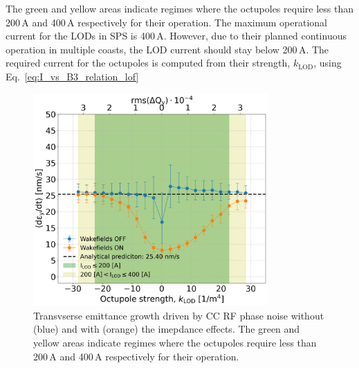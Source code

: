 The green and yellow areas indicate regimes where the octupoles require less than 200\,A and 400\,A respectively for their operation. The maximum operational current for the LODs in SPS is 400\,A. However, due to their planned continuous operation in multiple coasts, the LOD current should stay below 200\,A. The required current for the octupoles is computed from their strength, $k_\mathrm{LOD}$, using Eq.~\eqref{eq:I_vs_B3_relation_lof}


\begin{figure}[!h] %
   \centering         
   \includegraphics[width=0.8\textwidth]{images/Ch8/deyRates_sps_270GeV_PN1e-8_400MHz_SPS_NewWakesAllcontributions_appendWakes_y-plane_WakesONvsOFF_QpxQpy1_6D_Nb5e5_intensity3e10Scan_vs_TuneSpreadvsExpectedSPS_octupole_current.png}
       \caption{Transvserse emittance growth driven by CC RF phase noise without (blue) and with (orange) the imepdance effects. The green and yellow areas indicate regimes where the octupoles require less than 200\,A and 400\,A respectively for their operation.}
       \label{fig:pyheadtail_cc_impedance_2022_md_octupole_current}
\end{figure}

